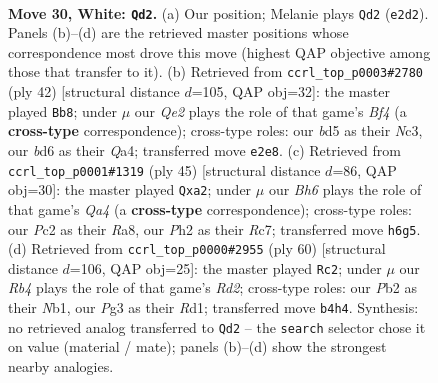 \documentclass[11pt]{article}
\begin{document}
\clearpage

\begin{figure}[p]\centering
\begin{subfigure}{0.46\textwidth}\centering
\resizebox{\linewidth}{!}{%
\newchessgame
\chessboard[
  setfen={r2qr3/ppp4k/3b1ppB/3b3p/PR6/2N3P1/RPP1QP1P/6K1 w - - 2 30},
  showmover=false,
  pgfstyle=straightmove, color=movearrow, markmove={e2-d2}
]}
\caption{}
\end{subfigure}\hfill
\begin{subfigure}{0.46\textwidth}\centering
\resizebox{\linewidth}{!}{%
\newchessgame
\chessboard[
  setfen={2bqr1k1/p2r1pb1/1p5p/2pP2p1/Q1P2B2/2N4P/P4PP1/2R2RK1 w - - 0 22},
  showmover=false,
  pgfstyle=straightmove, color=movearrow, markmove={f4-b8}
]}
\caption{}
\end{subfigure}
\\[4pt]
\begin{subfigure}{0.46\textwidth}\centering
\resizebox{\linewidth}{!}{%
\newchessgame
\chessboard[
  setfen={r5k1/1pr2p1p/3p2pb/qp2nP2/3B4/2P5/P3BRPP/1R1Q3K b - - 7 23},
  showmover=false,
  pgfstyle=straightmove, color=movearrow, markmove={a5-a2}
]}
\caption{}
\end{subfigure}\hfill
\begin{subfigure}{0.46\textwidth}\centering
\resizebox{\linewidth}{!}{%
\newchessgame
\chessboard[
  setfen={1kr1b3/1pq2p1B/4pQ1p/p1bpP3/7P/Pn4P1/3R1PK1/1N1R4 w - - 9 31},
  showmover=false,
  pgfstyle=straightmove, color=movearrow, markmove={d2-c2}
]}
\caption{}
\end{subfigure}
\caption{\textbf{Move 30, White: \texttt{Qd2}.} (a) Our position; Melanie plays \texttt{Qd2} (\texttt{e2d2}). Panels (b)--(d) are the retrieved master positions whose correspondence most drove this move (highest QAP objective among those that transfer to it). (b) Retrieved from \texttt{ccrl\_top\_p0003\#2780} (ply 42) [structural distance $d$=105, QAP obj=32]: the master played \texttt{Bb8}; under $\mu$ our \emph{Qe2} plays the role of that game's \emph{Bf4} (a \textbf{cross-type} correspondence); cross-type roles: our \emph{b}d5 as their \emph{N}c3, our \emph{b}d6 as their \emph{Q}a4; transferred move \texttt{e2e8}. (c) Retrieved from \texttt{ccrl\_top\_p0001\#1319} (ply 45) [structural distance $d$=86, QAP obj=30]: the master played \texttt{Qxa2}; under $\mu$ our \emph{Bh6} plays the role of that game's \emph{Qa4} (a \textbf{cross-type} correspondence); cross-type roles: our \emph{P}c2 as their \emph{R}a8, our \emph{P}h2 as their \emph{R}c7; transferred move \texttt{h6g5}. (d) Retrieved from \texttt{ccrl\_top\_p0000\#2955} (ply 60) [structural distance $d$=106, QAP obj=25]: the master played \texttt{Rc2}; under $\mu$ our \emph{Rb4} plays the role of that game's \emph{Rd2}; cross-type roles: our \emph{P}b2 as their \emph{N}b1, our \emph{P}g3 as their \emph{R}d1; transferred move \texttt{b4h4}. Synthesis: no retrieved analog transferred to \texttt{Qd2} -- the \texttt{search} selector chose it on value (material / mate); panels (b)--(d) show the strongest nearby analogies.}
\label{fig:thought-m58}
\end{figure}
\end{document}

